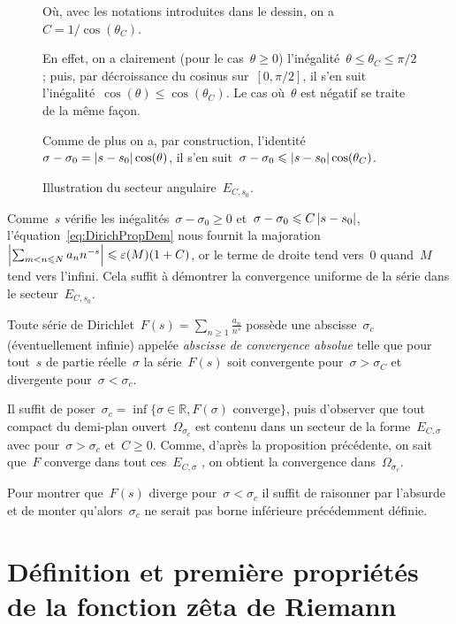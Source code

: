 \begin{dem}
\begin{figure}[h]
\begin{multicols}{2}
					Où, avec les notations introduites dans le dessin, on a~$C=1/\cos(\theta_C)$.
					
					En effet, on a clairement (pour le cas~$\theta\geq 0$) l'inégalité~$\theta\leq\theta_C\leq\pi/2$ ; puis, par décroissance du cosinus sur~$[0,\pi/2]$, il s'en suit l'inégalité~$\cos(\theta)\leq\cos(\theta_C)$. Le cas où~$\theta$ est négatif se traite de la même façon.
					
					Comme de plus on a, par construction, l'identité~$\sigma-\sigma_0 = \left\vert s-s_0\right\vert\cos(\theta)$, il s'en suit~$\sigma-\sigma_0 \leqslant \left\vert s-s_0\right\vert\cos(\theta_C)$.
				\end{multicols}
				\caption{Illustration du secteur angulaire~$E_{C,s_0}$.}
				\label{fig:secteurAng}
			\end{figure}
			Comme~$s$ vérifie les inégalités~$\sigma-\sigma_0\geq 0$ et~$\sigma-\sigma_0\leqslant C\left\vert s-s_0\right\vert$, l'équation~\eqref{eq:DirichPropDem} nous fournit la majoration~$\left\vert \sum_{m<n\leqslant N} a_n n^{-s}\right\vert \leqslant \varepsilon(M)(1+C)$, or le terme de droite tend vers~$0$ quand~$M$ tend vers l'infini. Cela suffit à démontrer la convergence uniforme de la série dans le secteur~$E_{C,s_0}$.
		\end{dem}
		\begin{coro}
			Toute série de Dirichlet~$F(s)=\sum_{n\geq 1} \frac{a_n}{n^s}$ possède une abscisse~$\sigma_c$ (éventuellement infinie) appelée \emph{abscisse de convergence absolue} telle que pour tout~$s$ de partie réelle~$\sigma$ la série~$F(s)$ soit convergente pour~$\sigma>\sigma_C$ et divergente pour~$\sigma<\sigma_c$.
		\end{coro}
		\begin{dem}
			Il suffit de poser~$\sigma_c=\inf\{\sigma\in\mathbb{R},F(\sigma)\text{ converge}\}$, puis d'observer que tout compact du demi-plan ouvert~$\Omega_{\sigma_c}$ est contenu dans un secteur de la forme~$E_{C,\sigma}$ avec pour~$\sigma>\sigma_c$ et~$C\geq 0$. Comme, d'après la proposition précédente, on sait que~$F$ converge dans tout ces~$E_{C,\sigma}$ , on obtient la convergence dans~$\Omega_{\sigma_c}$.
			
			Pour montrer que~$F(s)$ diverge pour~$\sigma<\sigma_c$ il suffit de raisonner par l'absurde et de monter qu'alors~$\sigma_c$ ne serait pas borne inférieure précédemment définie.
		\end{dem}
\section{Définition et première propriétés de la fonction zêta de Riemann}
